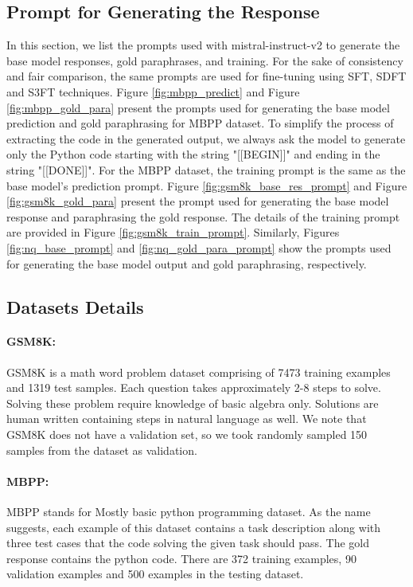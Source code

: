 \subsection{Prompt for Generating the Response}
\label{app:task-prompts}
In this section, we list the prompts used with mistral-instruct-v2 to generate the base model responses, gold paraphrases, and training. For the sake of consistency and fair comparison, the same prompts are used for fine-tuning using SFT, SDFT and S3FT techniques. Figure \ref{fig:mbpp_predict} and Figure  \ref{fig:mbpp_gold_para} present the prompts used for generating the base model prediction and gold paraphrasing for MBPP dataset. To simplify the process of extracting the code in the generated output, we always ask the model to generate only the Python code starting with the string "[[BEGIN]]" and ending in the string "[[DONE]]". For the MBPP dataset, the training prompt is the same as the base model's prediction prompt. Figure \ref{fig:gsm8k_base_res_prompt} and Figure \ref{fig:gsm8k_gold_para} present the prompt used for generating the base model response and paraphrasing the gold response. The details of the training prompt are provided in Figure \ref{fig:gsm8k_train_prompt}. Similarly, Figures \ref{fig:nq_base_prompt} and \ref{fig:nq_gold_para_prompt} show the prompts used for generating the base model output and gold paraphrasing, respectively.
\subsection{Datasets Details}
\label{app:data_detail}
\paragraph{GSM8K:} GSM8K is a math word problem dataset comprising of 7473 training examples and 1319 test samples. Each question takes approximately 2-8 steps to solve. Solving these problem require knowledge of basic algebra only. Solutions are human written containing steps in natural language as well. We note that GSM8K does not have a validation set, so we took randomly sampled 150 samples from the dataset as validation.

\paragraph{MBPP:} MBPP stands for Mostly basic python programming dataset. As the name suggests, each example of this dataset contains a task description along with three test cases that the code solving the given task should pass. The gold response contains the python code. There are 372 training examples, 90 validation examples and 500 examples in the testing dataset.

